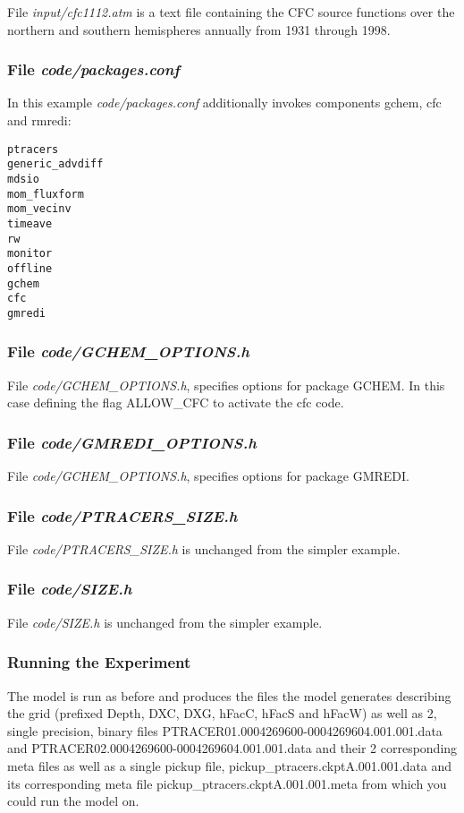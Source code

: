 \noindent File {\it input/cfc1112.atm} is a text file containing the
CFC source functions over the northern and southern hemispheres
annually from 1931 through 1998.

\subsubsection{File {\it code/packages.conf}}
\label{www:tutorials}

\noindent In this example {\it code/packages.conf} additionally
invokes components gchem, cfc and rmredi:

\begin {verbatim}
ptracers
generic_advdiff
mdsio
mom_fluxform
mom_vecinv
timeave
rw
monitor
offline
gchem
cfc
gmredi
\end{verbatim}

\subsubsection{File {\it code/GCHEM\_OPTIONS.h}}
\label{www:tutorials}

\noindent File {\it code/GCHEM\_OPTIONS.h}, specifies options for
package GCHEM. In this case defining the flag ALLOW\_CFC to activate
the cfc code.

\subsubsection{File {\it code/GMREDI\_OPTIONS.h}}
\label{www:tutorials}

\noindent File {\it code/GCHEM\_OPTIONS.h}, specifies options for
package GMREDI.

\subsubsection{File {\it code/PTRACERS\_SIZE.h}}
\label{www:tutorials}

\noindent File {\it code/PTRACERS\_SIZE.h} is unchanged from the
simpler example.

\subsubsection{File {\it code/SIZE.h}}
\label{www:tutorials}

\noindent File {\it code/SIZE.h} is unchanged from the simpler
example.


\subsubsection{Running the Experiment}
\label{www:tutorials}

The model is run as before and produces the files the model generates
describing the grid (prefixed Depth, DXC, DXG, hFacC, hFacS and hFacW)
as well as 2, single precision, binary files
PTRACER01.0004269600-0004269604.001.001.data and
PTRACER02.0004269600-0004269604.001.001.data and their 2 corresponding
meta files as well as a single pickup file,
pickup\_ptracers.ckptA.001.001.data and its corresponding meta file
pickup\_ptracers.ckptA.001.001.meta from which you could run the model
on.




